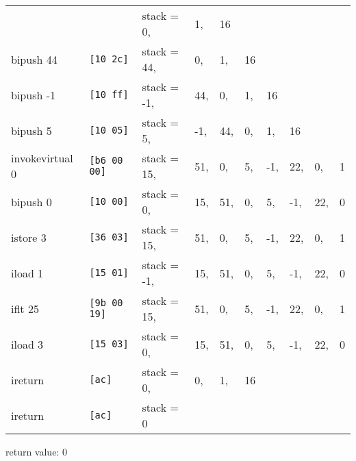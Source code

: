 \documentclass[12pt,a4paper]{article}
\begin{document}
\begin{tabular}{llllllllll}
                &                    & stack = 0,& 1,& 16 \\
bipush 44       & \texttt{[10 2c]   }& stack = 44,& 0,& 1,& 16 \\
bipush -1       & \texttt{[10 ff]   }& stack = -1,& 44,& 0,& 1,& 16 \\
bipush 5        & \texttt{[10 05]   }& stack = 5,& -1,& 44,& 0,& 1,& 16 \\
invokevirtual 0 & \texttt{[b6 00 00]}& stack = 15,& 51,& 0,& 5,& -1,& 22,& 0,& 1 \\
bipush 0        & \texttt{[10 00]   }& stack = 0,& 15,& 51,& 0,& 5,& -1,& 22,& 0 \\
istore 3        & \texttt{[36 03]   }& stack = 15,& 51,& 0,& 5,& -1,& 22,& 0,& 1 \\
iload 1         & \texttt{[15 01]   }& stack = -1,& 15,& 51,& 0,& 5,& -1,& 22,& 0 \\
iflt 25         & \texttt{[9b 00 19]}& stack = 15,& 51,& 0,& 5,& -1,& 22,& 0,& 1 \\
iload 3         & \texttt{[15 03]   }& stack = 0,& 15,& 51,& 0,& 5,& -1,& 22,& 0 \\
ireturn         & \texttt{[ac]      }& stack = 0,& 0,& 1,& 16 \\
ireturn         & \texttt{[ac]      }& stack = 0
\end{tabular}

return value: $0$
\end{document}
